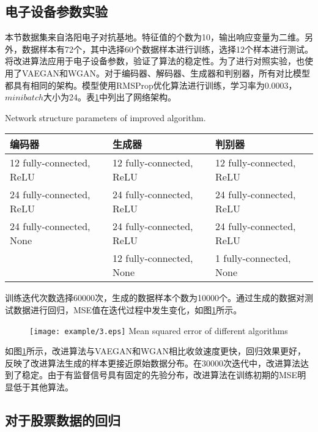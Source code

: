 \subsection{电子设备参数实验}

本节数据集来自洛阳电子对抗基地。特征值的个数为10，输出响应变量为二维。另外，数据样本有72个，其中选择60个数据样本进行训练，选择12个样本进行测试。将改进算法应用于电子设备参数，验证了算法的稳定性。为了进行对照实验，也使用了VAEGAN和WGAN。对于编码器、解码器、生成器和判别器，所有对比模型都具有相同的架构。模型使用RMSProp优化算法进行训练，学习率为0.0003，$minibatch$大小为24。表\ref{tab3}中列出了网络架构。

\begin{table}[htpb]
	\centering
	{Network structure parameters of improved algorithm.}
	\label{tab3}
	\begin{tabular}{lll} \toprule
		编码器   & 生成器 & 判别器  \\  \midrule
		12 fully-connected, ReLU &12 fully-connected, ReLU&12 fully-connected, ReLU\\
		24 fully-connected, ReLU&24 fully-connected, ReLU&24 fully-connected, ReLU\\
		24 fully-connected, None&24 fully-connected, ReLU&24 fully-connected, ReLU\\
		&12 fully-connected, None&1 fully-connected, None\\ \bottomrule
	\end{tabular}
\end{table}

训练迭代次数选择60000次，生成的数据样本个数为10000个。通过生成的数据对测试数据进行回归，MSE值在迭代过程中发生变化，如图\ref{fig3}所示。

\begin{figure}[htpb]
	\centering
	\texttt{[image: example/3.eps]}
	{Mean squared error of different algorithms}
	\label{fig3}
\end{figure}

如图\ref{fig3}所示，改进算法与VAEGAN和WGAN相比收敛速度更快，回归效果更好，反映了改进算法生成的样本更接近原始数据分布。在30000次迭代中，改进算法达到了稳定。由于有监督信号具有固定的先验分布，改进算法在训练初期的MSE明显低于其他算法。

\subsection{对于股票数据的回归}

